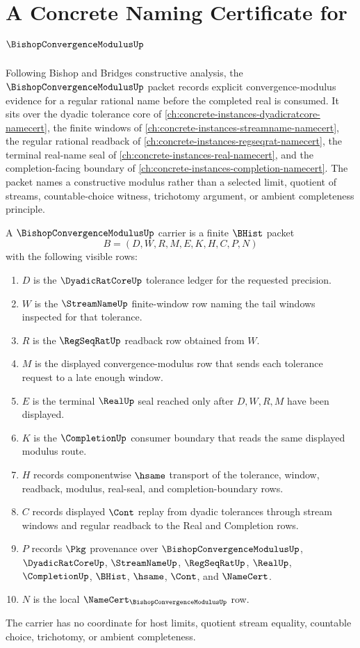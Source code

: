 \chapter{A Concrete Naming Certificate for $\BishopConvergenceModulusUp$}
\label{ch:concrete-instances-bishop-convergence-modulus-namecert}

Following Bishop and Bridges constructive analysis, the $\BishopConvergenceModulusUp$ packet records explicit convergence-modulus evidence for a regular rational name before the completed real is consumed. It sits over the dyadic tolerance core of \autoref{ch:concrete-instances-dyadicratcore-namecert}, the finite windows of \autoref{ch:concrete-instances-streamname-namecert}, the regular rational readback of \autoref{ch:concrete-instances-regseqrat-namecert}, the terminal real-name seal of \autoref{ch:concrete-instances-real-namecert}, and the completion-facing boundary of \autoref{ch:concrete-instances-completion-namecert}. The packet names a constructive modulus rather than a selected limit, quotient of streams, countable-choice witness, trichotomy argument, or ambient completeness principle.

\begin{definition}
\label{def:bishop-convergence-modulus-carrier}
A $\BishopConvergenceModulusUp$ carrier is a finite $\BHist$ packet
$$
B=(D,W,R,M,E,K,H,C,P,N)
$$
with the following visible rows:
\begin{enumerate}
\item $D$ is the $\DyadicRatCoreUp$ tolerance ledger for the requested precision.
\item $W$ is the $\StreamNameUp$ finite-window row naming the tail windows inspected for that tolerance.
\item $R$ is the $\RegSeqRatUp$ readback row obtained from $W$.
\item $M$ is the displayed convergence-modulus row that sends each tolerance request to a late enough window.
\item $E$ is the terminal $\RealUp$ seal reached only after $D,W,R,M$ have been displayed.
\item $K$ is the $\CompletionUp$ consumer boundary that reads the same displayed modulus route.
\item $H$ records componentwise $\hsame$ transport of the tolerance, window, readback, modulus, real-seal, and completion-boundary rows.
\item $C$ records displayed $\Cont$ replay from dyadic tolerances through stream windows and regular readback to the Real and Completion rows.
\item $P$ records $\Pkg$ provenance over $\BishopConvergenceModulusUp$, $\DyadicRatCoreUp$, $\StreamNameUp$, $\RegSeqRatUp$, $\RealUp$, $\CompletionUp$, $\BHist$, $\hsame$, $\Cont$, and $\NameCert$.
\item $N$ is the local $\NameCert_{\BishopConvergenceModulusUp}$ row.
\end{enumerate}
The carrier has no coordinate for host limits, quotient stream equality, countable choice, trichotomy, or ambient completeness.
\end{definition}

